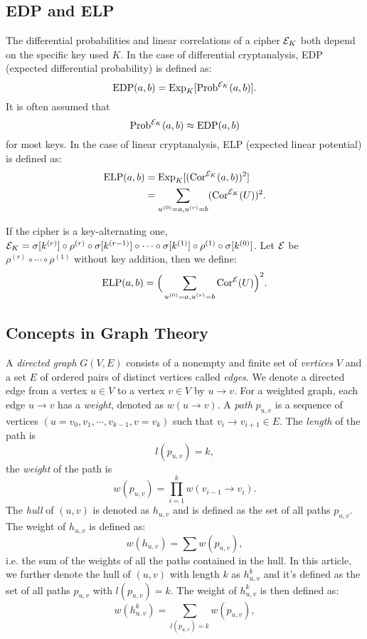 \subsection{EDP and ELP \cite{DR02}}
The differential probabilities and linear correlations of a cipher $\mathcal{E}_K$ both depend on the specific key used $K$. In the case of differential cryptanalysis, EDP (expected differential probability) is defined as:
\[
    \text{EDP}(a,b)=\text{Exp}_{K}[\text{Prob}^{\mathcal{E}_K}(a,b)].
\]
It is often assumed that
\[
    \text{Prob}^{\mathcal{E}_K}(a,b)\approx\text{EDP}(a,b)
\]
for most keys. In the case of linear cryptanalysis, ELP (expected linear potential) is defined as:
\begin{align*}
    \text{ELP}(a,b)&=\text{Exp}_{K}[(\text{Cor}^{\mathcal{E}_K}(a,b))^2]\\
    &=\sum\limits_{u^{(0)}=a,u^{(r)}=b}(\text{Cor}^{\mathcal{E}_K}(U))^2.
\end{align*}
    

If the cipher is a key-alternating one, $\mathcal{E}_K=\sigma[k^{(r)}]\circ\rho^{(r)}\circ\sigma[k^{(r-1)}]\circ\cdots\circ\sigma[k^{(1)}]\circ\rho^{(1)}\circ\sigma[k^{(0)}]$. Let $\mathcal{E}$ be $\rho^{(r)}\circ\cdots\circ\rho^{(1)}$ without key addition, then we define:
\[
    \text{ELP}(a,b)=\Big(\sum\limits_{u^{(0)}=a,u^{(r)}=b}\text{Cor}^{\mathcal{E}}(U)\Big)^2.
\]


\subsection{Concepts in Graph Theory}

A \textit{directed graph} $G(V, E)$ consists of a nonempty and finite set of \textit{vertices} $V$ and a set $E$ of ordered pairs of distinct vertices called \textit{edges}. We denote a directed edge from a vertex $u\in V$ to a vertex $v\in V$ by $u\rightarrow v$. For a weighted graph, each edge $u\rightarrow v$ has a \textit{weight}, denoted as $w(u\rightarrow v)$. A \textit{path} $p_{u,v}$ is a sequence of vertices $(u=v_0,v_1,\cdots,v_{k-1},v=v_k)$ such that $v_i\rightarrow v_{i+1}\in E$. The \textit{length} of the path is
\[
    l(p_{u,v})=k,
\]
the \textit{weight} of the path is
\[
    w(p_{u,v})=\prod\limits_{i=1}^{k}w(v_{i-1}\rightarrow v_i).
\]
The \textit{hull} of $(u,v)$ is denoted as $h_{u,v}$ and is defined as the set of all paths $p_{u,v}$. The weight of $h_{u,v}$ is defined as:
\[
    w(h_{u,v})=\sum w(p_{u,v}),
\]
i.e. the sum of the weights of all the paths contained in the hull. In this article, we further denote the hull of $(u,v)$ with length $k$ as $h_{u,v}^k$ and it's defined as the set of all paths $p_{u,v}$ with $l(p_{u,v})=k$. The weight of $h_{u,v}^k$ is then defined as:
\[
    w(h_{u,v}^k)=\sum\limits_{l(p_{u,v})=k} w(p_{u,v}),
\]

